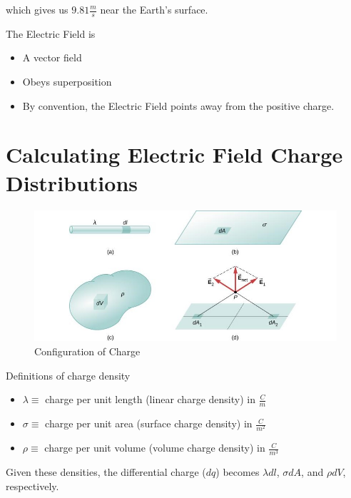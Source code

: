 \documentclass[14pt]{memoir}
\begin{document}
which gives us $9.81 \frac{m}{s}$ near the Earth's surface.


The Electric Field is
\begin{itemize}
\item A vector field
\item Obeys superposition
\item By convention, the Electric Field points away from the positive charge. 
\end{itemize}

\section{Calculating Electric Field Charge Distributions}

\begin{figure}[h]
\begin{center}
\includegraphics[scale=0.60]{fig/fig_05_22.jpg}
\caption{Configuration of Charge}
\label{fig:05_22}
\end{center}
\end{figure}

Definitions of charge density
\begin{itemize}
\item $\lambda \equiv $ charge per unit length (linear charge density) in $\frac{C}{m}$
\item $\sigma \equiv $ charge per unit area (surface charge density) in $\frac{C}{m^2}$
\item $\rho \equiv $ charge per unit volume (volume charge density) in $\frac{C}{m^3}$
\end{itemize}

Given these densities, the differential charge ($dq$) becomes $\lambda dl$, $\sigma dA$, and $\rho dV$, respectively. 
\end{document}
